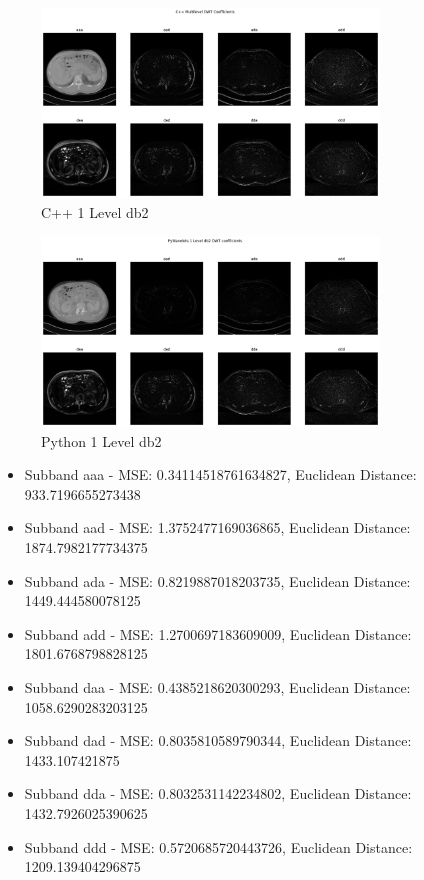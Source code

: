 \documentclass{article}
\begin{document}
\begin{figure}[H]
    \centering
    \includegraphics[width=0.8\textwidth]{assets/cpp-1-db2.png}
    \caption{C++ 1 Level db2}
    \label{fig11}
\end{figure}

\begin{figure}[H]
    \centering
    \includegraphics[width=0.8\textwidth]{assets/py-1-db2.png}
    \caption{Python 1 Level db2}
    \label{fig12}
\end{figure}

\begin{itemize}
    \item Subband aaa - MSE: 0.34114518761634827, Euclidean Distance: 933.7196655273438
    \item Subband aad - MSE: 1.3752477169036865, Euclidean Distance: 1874.7982177734375
    \item Subband ada - MSE: 0.8219887018203735, Euclidean Distance: 1449.444580078125
    \item Subband add - MSE: 1.2700697183609009, Euclidean Distance: 1801.6768798828125
    \item Subband daa - MSE: 0.4385218620300293, Euclidean Distance: 1058.6290283203125
    \item Subband dad - MSE: 0.8035810589790344, Euclidean Distance: 1433.107421875
    \item Subband dda - MSE: 0.8032531142234802, Euclidean Distance: 1432.7926025390625
    \item Subband ddd - MSE: 0.5720685720443726, Euclidean Distance: 1209.139404296875
\end{itemize}
\end{document}
